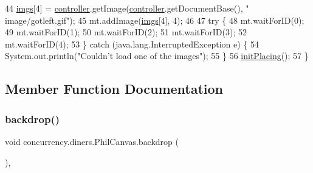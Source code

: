 \begin{DoxyCode}
44         \mbox{\hyperlink{classconcurrency_1_1diners_1_1_phil_canvas_a107d0c96c4c1050eca2998d5ae198cea}{imgs}}[4] = \mbox{\hyperlink{classconcurrency_1_1diners_1_1_phil_canvas_a4c2bf3503b1a431ccacca410c3abd222}{controller}}.getImage(\mbox{\hyperlink{classconcurrency_1_1diners_1_1_phil_canvas_a4c2bf3503b1a431ccacca410c3abd222}{controller}}.getDocumentBase(), \textcolor{stringliteral}{"
      image/gotleft.gif"});
45         mt.addImage(\mbox{\hyperlink{classconcurrency_1_1diners_1_1_phil_canvas_a107d0c96c4c1050eca2998d5ae198cea}{imgs}}[4], 4);
46 
47         \textcolor{keywordflow}{try} \{
48             mt.waitForID(0);
49             mt.waitForID(1);
50             mt.waitForID(2);
51             mt.waitForID(3);
52             mt.waitForID(4);
53         \} \textcolor{keywordflow}{catch} (java.lang.InterruptedException e) \{
54             System.out.println(\textcolor{stringliteral}{"Couldn't load one of the images"});
55         \}
56         \mbox{\hyperlink{classconcurrency_1_1diners_1_1_phil_canvas_a65114f14ba53ecc6b73a7fbac3f27e1d}{initPlacing}}();
57     \}
\end{DoxyCode}


\subsection{Member Function Documentation}
\mbox{\label{classconcurrency_1_1diners_1_1_phil_canvas_af3662f3ac17bd8dcb12f9c71d1a8b9f1}} 
\subsubsection{\texorpdfstring{backdrop()}{backdrop()}}
{\footnotesize\ttfamily void concurrency.\+diners.\+Phil\+Canvas.\+backdrop (\begin{DoxyParamCaption}{ }\end{DoxyParamCaption})\hspace{0.3cm}{\ttfamily [inline]}, {\ttfamily [package]}}


